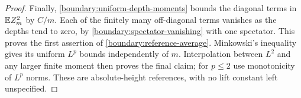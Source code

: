 \begin{proof}
Finally, \eqref{boundary:uniform-depth-moments} bounds the diagonal
terms in $\mathbb E Z_m^2$ by $C/m$.  Each of the finitely many off-diagonal
terms vanishes as the depths tend to zero, by
\eqref{boundary:spectator-vanishing} with one spectator.  This proves
the first assertion of \eqref{boundary:reference-average}.
Minkowski's inequality gives its uniform $L^p$ bounds independently
of $m$.  Interpolation between $L^2$ and any larger finite moment
then proves the final claim; for $p\le2$ use monotonicity of
$L^p$ norms.  These are absolute-height references, with no lift
constant left unspecified.
\end{proof}
